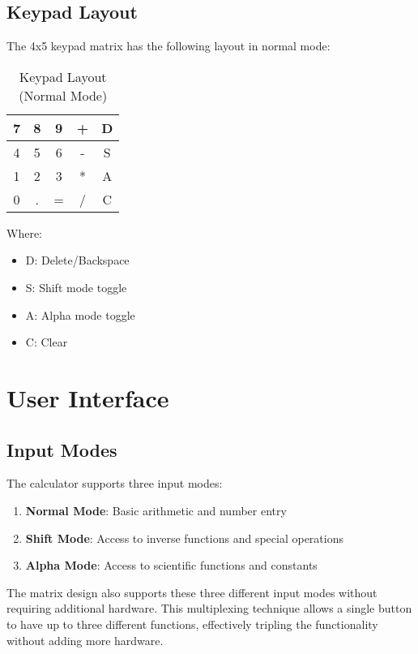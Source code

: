 \documentclass{article}
\begin{document}
\subsection{Keypad Layout}
The 4x5 keypad matrix has the following layout in normal mode:

\begin{table}[h]
\centering
\begin{tabular}{|c|c|c|c|c|}
\hline
7 & 8 & 9 & + & D \\
\hline
4 & 5 & 6 & - & S \\
\hline
1 & 2 & 3 & * & A \\
\hline
0 & . & = & / & C \\
\hline
\end{tabular}
\caption{Keypad Layout (Normal Mode)}
\end{table}

Where:
\begin{itemize}
    \item D: Delete/Backspace
    \item S: Shift mode toggle
    \item A: Alpha mode toggle
    \item C: Clear
\end{itemize}

\section{User Interface}

\subsection{Input Modes}
The calculator supports three input modes:

\begin{enumerate}
    \item \textbf{Normal Mode}: Basic arithmetic and number entry
    \item \textbf{Shift Mode}: Access to inverse functions and special operations
    \item \textbf{Alpha Mode}: Access to scientific functions and constants
\end{enumerate}

The matrix design also supports these three different input modes without requiring additional hardware. This multiplexing technique allows a single button to have up to three different functions, effectively tripling the functionality without adding more hardware.
\end{document}
